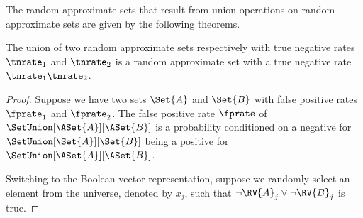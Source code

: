 \documentclass[ ../main.tex]{subfiles}
\begin{document}
The random approximate sets that result from union operations on random approximate sets are given by the following theorems.
\begin{theorem}
	\label{thm:union_fp}
	The union of two random approximate sets respectively with true negative rates $\tnrate_1$ and $\tnrate_2$ is a random approximate set with a true negative rate 
	$\tnrate_1 \tnrate_2$.
\end{theorem}
\begin{proof}
	Suppose we have two sets $\Set{A}$ and $\Set{B}$ with false positive rates $\fprate_1$ and $\fprate_2$. The false positive rate $\fprate$ of $\SetUnion[\ASet{A}][\ASet{B}]$ is a probability conditioned on a negative for $\SetUnion[\Set{A}][\Set{B}]$ being a positive for $\SetUnion[\ASet{A}][\ASet{B}]$.
	
	Switching to the Boolean vector representation, suppose we randomly select an element from the universe, denoted by $x_j$, such that $\neg \RV{A}_j \lor \neg \RV{B}_j$ is true.
	

\end{proof}
\end{document}

